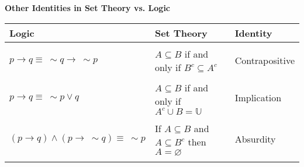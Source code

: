 \documentclass[11pt]{article}
\begin{document}
\begin{center}
\bigskip
    {\bf Other Identities in Set Theory vs. Logic}

\begin{tabular}{l|l|l}
\toprule
Logic                    & Set Theory                 & Identity \\
\midrule
\phantom{h} & \phantom{h} & \phantom{h} \\
$p \rightarrow q \equiv \ \sim q \rightarrow \ \sim p$ 
& $A \subseteq B$ if and only if $B^c \subseteq A^c$ 
&Contrapositive \\
\phantom{h} & \phantom{h} & \phantom{h} \\
$p \rightarrow q \equiv \ \sim p \vee q$ 
& $A \subseteq B$ if and only if $A^c \cup B = \mathbb{U}$
&Implication \\
\phantom{h} & \phantom{h} & \phantom{h} \\
$(p \rightarrow q) \wedge (p \rightarrow \ \sim q) \equiv \ \sim p$
&If $A \subseteq B$ and $A \subseteq B^c$ then $A = \varnothing$
&Absurdity \\
\phantom{h} & \phantom{h} & \phantom{h} \\
\bottomrule
\end{tabular}
\end{center}
\end{document}
